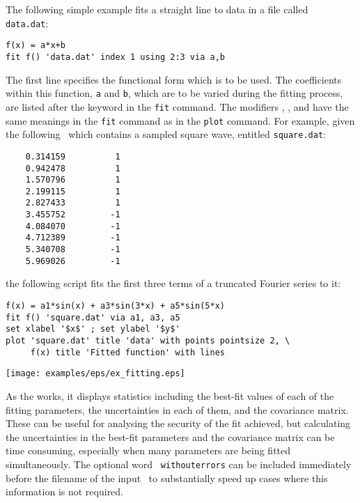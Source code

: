 The following simple example fits a straight line to data in a file called {\tt
data.dat}:

\begin{verbatim}
f(x) = a*x+b
fit f() 'data.dat' index 1 using 2:3 via a,b
\end{verbatim}

\noindent The first line specifies the functional form which is to be used.
The coefficients within this function, {\tt a} and {\tt b}, which are to be
varied during the fitting process, are listed after the keyword 
in the {\tt fit} command.  The modifiers , ,
 and  have the same meanings in the {\tt fit}
command as in the {\tt plot} command. For example, given the following
\datafile\ which contains a sampled square wave, entitled {\tt square.dat}:

\begin{verbatim}
    0.314159          1
    0.942478          1
    1.570796          1
    2.199115          1
    2.827433          1
    3.455752         -1
    4.084070         -1
    4.712389         -1
    5.340708         -1
    5.969026         -1
\end{verbatim}

\noindent the following script fits the first three terms of a truncated
Fourier series to it:

\begin{verbatim}
f(x) = a1*sin(x) + a3*sin(3*x) + a5*sin(5*x)
fit f() 'square.dat' via a1, a3, a5
set xlabel '$x$' ; set ylabel '$y$'
plot 'square.dat' title 'data' with points pointsize 2, \
     f(x) title 'Fitted function' with lines
\end{verbatim}

\begin{center}
\texttt{[image: examples/eps/ex\_fitting.eps]}
\end{center}

As the  works, it displays statistics including the best-fit
values of each of the fitting parameters, the uncertainties in each of them,
and the covariance matrix. These can be useful for analysing the security of
the fit achieved, but calculating the uncertainties in the best-fit parameters
and the covariance matrix can be time consuming, especially when many
parameters are being fitted simultaneously. The optional word {\tt
withouterrors} can be included immediately before the filename of the input
\datafile\ to substantially speed up cases where this information is not
required.

